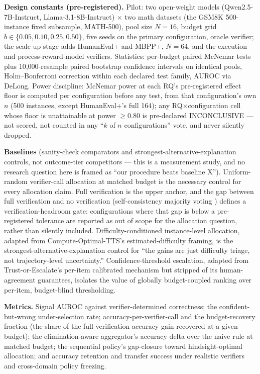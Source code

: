 \documentclass[11pt]{article}
\begin{document}
\textbf{Design constants (pre-registered).} Pilot: two open-weight models (Qwen2.5-7B-Instruct, Llama-3.1-8B-Instruct) $\times$ two math datasets (the GSM8K 500-instance fixed subsample, MATH-500), pool size $N = 16$, budget grid $b \in \{0.05, 0.10, 0.25, 0.50\}$, five seeds on the primary configuration, oracle verifier; the scale-up stage adds HumanEval+ and MBPP+, $N = 64$, and the execution- and process-reward-model verifiers. Statistics: per-budget paired McNemar tests plus 10{,}000-resample paired bootstrap confidence intervals on identical pools, Holm--Bonferroni correction within each declared test family, AUROC via DeLong. Power discipline: McNemar power at each RQ's pre-registered effect floor is computed per configuration before any test, from that configuration's own $n$ (500 instances, except HumanEval+'s full 164); any RQ$\times$configuration cell whose floor is unattainable at power $\geq 0.80$ is pre-declared INCONCLUSIVE --- not scored, not counted in any ``$k$ of $n$ configurations'' vote, and never silently dropped.

\textbf{Baselines} (sanity-check comparators and strongest-alternative-explanation controls, not outcome-tier competitors --- this is a measurement study, and no research question here is framed as ``our procedure beats baseline X''). Uniform-random verifier-call allocation at matched budget is the necessary control for every allocation claim. Full verification is the upper anchor, and the gap between full verification and no verification (self-consistency majority voting \citep{WangSelfConsistency2023}) defines a verification-headroom gate: configurations where that gap is below a pre-registered tolerance are reported as out of scope for the allocation question, rather than silently included. Difficulty-conditioned instance-level allocation, adapted from Compute-Optimal-TTS's \citep{ComputeOptTTS2607} estimated-difficulty framing, is the strongest-alternative-explanation control for ``the gains are just difficulty triage, not trajectory-level uncertainty.'' Confidence-threshold escalation, adapted from Trust-or-Escalate's \citep{TrustOrEscalate2607} per-item calibrated mechanism but stripped of its human-agreement guarantees, isolates the value of globally budget-coupled ranking over per-item, budget-blind thresholding.

\textbf{Metrics.} Signal AUROC against verifier-determined correctness; the confident-but-wrong under-selection rate; accuracy-per-verifier-call and the budget-recovery fraction (the share of the full-verification accuracy gain recovered at a given budget); the elimination-aware aggregator's accuracy delta over the naive rule at matched budget; the sequential policy's gap-closure toward hindsight-optimal allocation; and accuracy retention and transfer success under realistic verifiers and cross-domain policy freezing.
\end{document}
